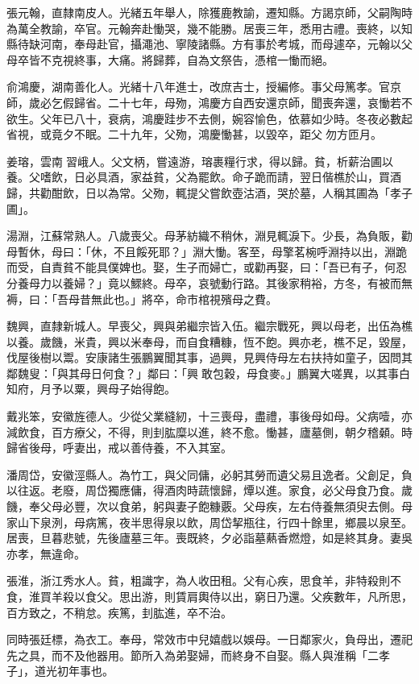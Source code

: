 \begin{pinyinscope}
張元翰，直隸南皮人。光緒五年舉人，除獲鹿教諭，遷知縣。方謁京師，父嗣陶時為萬全教諭，卒官。元翰奔赴慟哭，幾不能勝。居喪三年，悉用古禮。喪終，以知縣待缺河南，奉母赴官，攝澠池、寧陵諸縣。方有事於考城，而母遽卒，元翰以父母卒皆不克視終事，大痛。將歸葬，自為文祭告，憑棺一慟而絕。

俞鴻慶，湖南善化人。光緒十八年進士，改庶吉士，授編修。事父母篤孝。官京師，歲必乞假歸省。二十七年，母歾，鴻慶方自西安還京師，聞喪奔還，哀慟若不欲生。父年已八十，衰病，鴻慶跬步不去側，婉容愉色，依慕如少時。冬夜必數起省視，或竟夕不眠。二十九年，父歾，鴻慶慟甚，以毀卒，距父勿方匝月。

姜瑢，雲南習峨人。父文柄，嘗遠游，瑢裹糧行求，得以歸。貧，析薪治圃以養。父嗜飲，日必具酒，家益貧，父為罷飲。命子跪而請，翌日偕樵於山，買酒歸，共勸酣飲，日以為常。父歾，輒提父嘗飲壺沽酒，哭於墓，人稱其圃為「孝子圃」。

湯淵，江蘇常熟人。八歲喪父。母茅紡織不稍休，淵見輒淚下。少長，為負販，勸母暫休，母曰：「休，不且餒死耶？」淵大慟。客至，母擎茗椀呼淵持以出，淵跪而受，自責貧不能具僕婢也。娶，生子而婦亡，或勸再娶，曰：「吾已有子，何忍分養母力以養婦？」竟以鰥終。母卒，哀號動行路。其後家稍裕，方冬，有被而無褥，曰：「吾母昔無此也。」將卒，命市棺視殯母之費。

魏興，直隸新城人。早喪父，興與弟繼宗皆入伍。繼宗戰死，興以母老，出伍為樵以養。歲饑，米貴，興以米奉母，而自食糟糠，恆不飽。興亦老，樵不足，毀屋，伐屋後樹以鬻。安康諸生張鵬翼聞其事，過興，見興侍母左右扶持如童子，因問其鄰魏叟：「與其母日何食？」鄰曰：「興敢包穀，母食麥。」鵬翼大嗟異，以其事白知府，月予以粟，興母子始得飽。

戴兆笨，安徽旌德人。少從父業縫紉，十三喪母，盡禮，事後母如母。父病噎，亦減飲食，百方療父，不得，則刲肱糜以進，終不愈。慟甚，廬墓側，朝夕稽顙。時歸省後母，呼妻出，戒以善侍養，不入其室。

潘周岱，安徽涇縣人。為竹工，與父同傭，必躬其勞而遺父易且逸者。父創足，負以往返。老廢，周岱獨應傭，得酒肉時蔬懷歸，燂以進。家食，必父母食乃食。歲饑，奉父母必豐，次以食弟，躬與妻子飽糠覈。父母疾，左右侍養無須臾去側。母家山下泉洌，母病篤，夜半思得泉以飲，周岱挈瓶往，行四十餘里，鄉晨以泉至。居喪，旦暮悲號，先後廬墓三年。喪既終，夕必詣墓爇香燃燈，如是終其身。妻吳亦孝，無違命。

張淮，浙江秀水人。貧，粗識字，為人收田租。父有心疾，思食羊，非特殺則不食，淮買羊殺以食父。思出游，則賃肩輿侍以出，窮日乃還。父疾數年，凡所思，百方致之，不稍怠。疾篤，刲肱進，卒不治。

同時張廷標，為衣工。奉母，常效市中兒嬉戲以娛母。一日鄰家火，負母出，遷祀先之具，而不及他器用。節所入為弟娶婦，而終身不自娶。縣人與淮稱「二孝子」，道光初年事也。


\end{pinyinscope}
